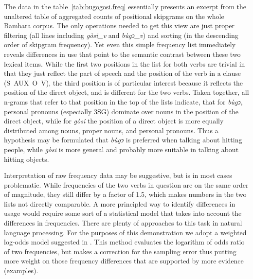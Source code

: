 \documentclass[12pt]{article}
\begin{document}
The data in the table~\ref{tab:bugogosi.freq} essentially presents an
excerpt from the unaltered table of aggregated counts of positional
skipgrams on the whole Bambara corpus. The only operations needed to
get this view are just proper filtering (all lines including
\textit{gòsi\_v} and \textit{bùgɔ\_v}) and sorting (in the descending
order of skipgram frequency). Yet even this simple frequency list
immediately reveals differences in use that point to the semantic
contrast between these two lexical items. While the first two
positions in the list for both verbs are trivial in that they just
reflect the part of speech and the position of the verb in a clause
(\mbox{S AUX O V}), the third position is of particular interest
because it reflects the position of the direct object, and is different
for the two verbs. Taken together, all n-grams that refer to that
position in the top of the lists indicate, that for \textit{bùgɔ},
personal pronouns (especially 3SG) dominate over nouns in the position
of the direct object, while for \textit{gòsi} the position of a direct
object is more equally distributed among nouns, proper nouns, and
personal pronouns. Thus a hypothesis may be formulated that
\textit{bùgɔ} is preferred when talking about hitting people, while
\textit{gòsi} is more general and probably more suitable in talking
about hitting objects.

Interpretation of raw frequency data may be suggestive, but is in most
cases problematic. While frequencies of the two verbs in question are
on the same order of magnitude, they still differ by a factor of 1.5,
which makes numbers in the two lists not directly comparable. A more
principled way to identify differences in usage would require some
sort of a statistical model that takes into account the differences in
frequencies. There are plenty of approaches to this task in natural
language processing. For the purposes of this demonstration we adopt a
weighted log-odds model suggested in \textcite{monroe2008}. This method
evaluates the logarithm of odds ratio of two frequencies, but makes a
correction for the sampling error thus putting more weight on those
frequency differences that are supported by more evidence
(examples). 
\end{document}

